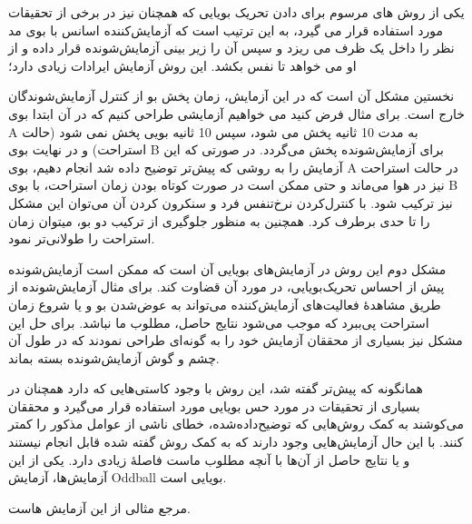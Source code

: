 \documentclass[oneside]{report}
\begin{document}
یکی از روش های مرسوم برای دادن تحریک بویایی که همچنان نیز در برخی از تحقیقات مورد استفاده قرار می گیرد، به این ترتیب است که آزمایش‌کننده اسانس با بوی مد نظر را داخل یک ظرف می ریزد و سپس آن را زیر بینی آزمایش‌شونده قرار داده و از او می خواهد تا نفس بکشد. این روش آزمایش ایرادات زیادی دارد؛


 نخستین مشکل آن است که در این آزمایش، زمان پخش بو از کنترل آزمایش‌شوندگان خارج است. برای مثال فرض کنید می خواهیم آزمایشی طراحی کنیم که در آن ابتدا بوی A به مدت 10 ثانیه پخش می شود، سپس 10 ثانیه بویی پخش نمی شود (حالت استراحت) و در نهایت بوی B برای آزمایش‌شونده پخش می‌گردد. در صورتی که این آزمایش را به روشی که پیش‌تر توضیح داده شد انجام دهیم، بوی A در حالت استراحت نیز در هوا می‌ماند و حتی ممکن است در صورت کوتاه بودن زمان استراحت، با بوی B نیز ترکیب شود. با کنترل‌کردن نرخ‌تنفس فرد و سنکرون کردن آن می‌توان این مشکل را تا حدی برطرف کرد. همچنین به منظور جلوگیری از ترکیب دو بو، میتوان زمان استراحت را طولانی‌تر نمود.


مشکل دوم این روش در آزمایش‌های بویایی آن است که ممکن است آزمایش‌شونده پیش از احساس تحریک‌بویایی، در مورد آن قضاوت کند. برای مثال آزمایش‌شونده از طریق مشاهدهٔ فعالیت‌های آزمایش‌کننده می‌تواند به عوض‌شدن بو و یا شروع زمان 
استراحت پی‌ببرد که موجب می‌شود نتایج حاصل، مطلوب ما نباشد. برای حل این مشکل نیز بسیاری از محققان آزمایش خود را به گونه‌ای طراحی نمودند که در طول آن چشم و گوش آزمایش‌شونده بسته بماند.

همانگونه که پیش‌تر گفته شد، این روش با وجود کاستی‌هایی که دارد همچنان در بسیاری از تحقیقات در مورد حس بویایی مورد استفاده قرار می‌گیرد و محققان می‌کوشند به کمک روش‌هایی که توضیح‌داده‌شده، خطای ناشی از عوامل مذکور را کمتر کنند.
با این حال آزمایش‌هایی وجود دارند که به کمک روش گفته شده قابل انجام نیستند و یا نتایج حاصل از آن‌ها با آنچه مطلوب ماست فاصلهٔ زیادی دارد. یکی از این آزمایش‌ها، آزمایش Oddball بویایی است. 

مرجع \cite{Kroupi} مثالی از این آزمایش هاست.
\end{document}
